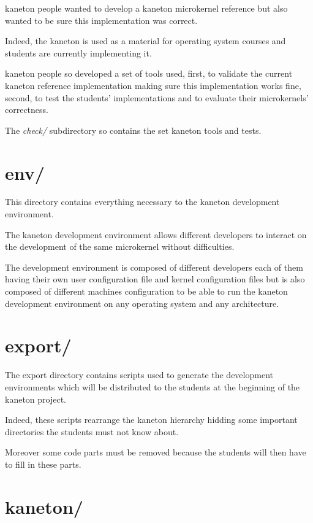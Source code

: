 kaneton people wanted to develop a kaneton microkernel reference but
also wanted to be sure this implementation was correct.

Indeed, the kaneton is used as a material for operating system courses and
students are currently implementing it.

kaneton people so developed a set of tools used, first, to validate the
current kaneton reference implementation making sure this implementation
works fine, second, to test the students' implementations and to evaluate
their microkernels' correctness.

The \textit{check/} subdirectory so contains the set kaneton tools and tests.

%
%

\section{env/}

This directory contains everything necessary to the kaneton
development environment.

The kaneton development environment allows different developers to
interact on the development of the same microkernel without difficulties.

The development environment is composed of different developers each
of them having their own user configuration file and kernel configuration
files but is also composed of different machines configuration to be able
to run the kaneton development environment on any operating system and any
architecture.

%
%

\section{export/}

The export directory contains scripts used to generate the
development environments which will be distributed to the students
at the beginning of the kaneton project.

Indeed, these scripts rearrange the kaneton hierarchy hidding some
important directories the students must not know about.

Moreover some code parts must be removed because the students will
then have to fill in these parts.

%
%

\section{kaneton/}

